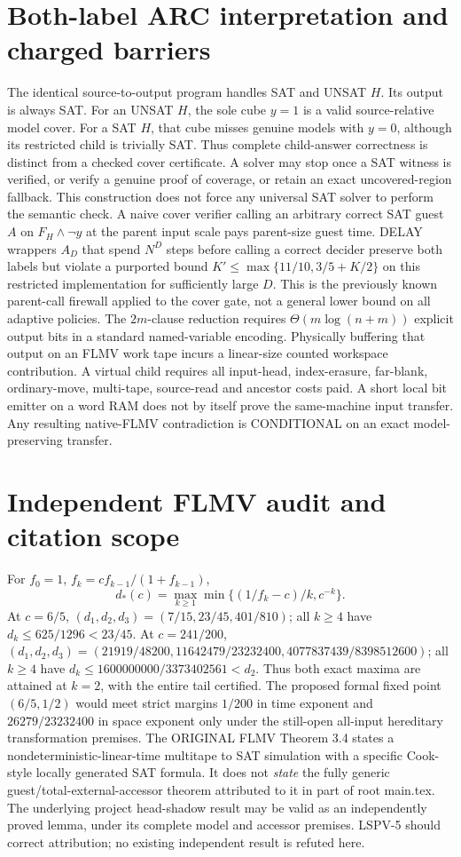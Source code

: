 \documentclass[11pt]{article}
\begin{document}
\section{Both-label ARC interpretation and charged barriers}
The identical source-to-output program handles SAT and UNSAT $H$. Its output is always SAT. For an UNSAT $H$, the sole cube $y=1$ is a valid source-relative model cover. For a SAT $H$, that cube misses genuine models with $y=0$, although its restricted child is trivially SAT. Thus complete child-answer correctness is distinct from a checked cover certificate. A solver may stop once a SAT witness is verified, or verify a genuine proof of coverage, or retain an exact uncovered-region fallback. This construction does not force any universal SAT solver to perform the semantic check.
A naive cover verifier calling an arbitrary correct SAT guest $A$ on $F_H\land\neg y$ at the parent input scale pays parent-size guest time. DELAY wrappers $A_D$ that spend $N^D$ steps before calling a correct decider preserve both labels but violate a purported bound $K'\le\max\{11/10,3/5+K/2\}$ on this restricted implementation for sufficiently large $D$. This is the previously known parent-call firewall applied to the cover gate, not a general lower bound on all adaptive policies.
The $2m$-clause reduction requires $\Theta(m\log(n+m))$ explicit output bits in a standard named-variable encoding. Physically buffering that output on an FLMV work tape incurs a linear-size counted workspace contribution. A virtual child requires all input-head, index-erasure, far-blank, ordinary-move, multi-tape, source-read and ancestor costs paid. A short local bit emitter on a word RAM does not by itself prove the same-machine input transfer. Any resulting native-FLMV contradiction is CONDITIONAL on an exact model-preserving transfer.
\section{Independent FLMV audit and citation scope}
For $f_0=1$, $f_k=cf_{k-1}/(1+f_{k-1})$,
\[
d_*(c)=\max_{k\ge1}\min\{(1/f_k-c)/k,c^{-k}\}.
\]
At $c=6/5$, $(d_1,d_2,d_3)=(7/15,23/45,401/810)$; all $k\ge4$ have $d_k\le625/1296<23/45$. At $c=241/200$, $(d_1,d_2,d_3)=(21919/48200,11642479/23232400,4077837439/8398512600)$; all $k\ge4$ have $d_k\le1600000000/3373402561<d_2$. Thus both exact maxima are attained at $k=2$, with the entire tail certified. The proposed formal fixed point $(6/5,1/2)$ would meet strict margins $1/200$ in time exponent and $26279/23232400$ in space exponent only under the still-open all-input hereditary transformation premises.
The ORIGINAL FLMV Theorem 3.4 states a nondeterministic-linear-time multitape to SAT simulation with a specific Cook-style locally generated SAT formula. It does not \emph{state} the fully generic guest/total-external-accessor theorem attributed to it in part of root main.tex. The underlying project head-shadow result may be valid as an independently proved lemma, under its complete model and accessor premises. LSPV-5 should correct attribution; no existing independent result is refuted here.
\end{document}
